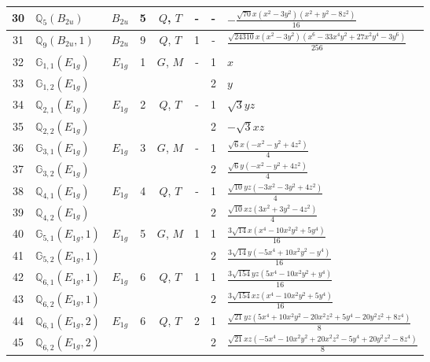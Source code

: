 \documentclass[fleqn,10pt,landscape]{jsarticle}
\begin{document}
\begin{longtable}[l]{clcccccl}
30 & $\mathbb{Q}_{5}(B_{2u})$ & $B_{2u}$ & 5 & $Q$, $T$ & - & - & $- \frac{\sqrt{70} x \left(x^{2} - 3 y^{2}\right) \left(x^{2} + y^{2} - 8 z^{2}\right)}{16}$ \\ \hline
31 & $\mathbb{Q}_{9}(B_{2u},1)$ & $B_{2u}$ & 9 & $Q$, $T$ & 1 & - & $\frac{\sqrt{24310} x \left(x^{2} - 3 y^{2}\right) \left(x^{6} - 33 x^{4} y^{2} + 27 x^{2} y^{4} - 3 y^{6}\right)}{256}$ \\ \hline
32 & $\mathbb{G}_{1,1}(E_{1g})$ & $E_{1g}$ & 1 & $G$, $M$ & - & 1 & $x$ \\
33 & $\mathbb{G}_{1,2}(E_{1g})$ &  &  &  &  & 2 & $y$ \\ \hline
34 & $\mathbb{Q}_{2,1}(E_{1g})$ & $E_{1g}$ & 2 & $Q$, $T$ & - & 1 & $\sqrt{3} y z$ \\
35 & $\mathbb{Q}_{2,2}(E_{1g})$ &  &  &  &  & 2 & $- \sqrt{3} x z$ \\ \hline
36 & $\mathbb{G}_{3,1}(E_{1g})$ & $E_{1g}$ & 3 & $G$, $M$ & - & 1 & $\frac{\sqrt{6} x \left(- x^{2} - y^{2} + 4 z^{2}\right)}{4}$ \\
37 & $\mathbb{G}_{3,2}(E_{1g})$ &  &  &  &  & 2 & $\frac{\sqrt{6} y \left(- x^{2} - y^{2} + 4 z^{2}\right)}{4}$ \\ \hline
38 & $\mathbb{Q}_{4,1}(E_{1g})$ & $E_{1g}$ & 4 & $Q$, $T$ & - & 1 & $\frac{\sqrt{10} y z \left(- 3 x^{2} - 3 y^{2} + 4 z^{2}\right)}{4}$ \\
39 & $\mathbb{Q}_{4,2}(E_{1g})$ &  &  &  &  & 2 & $\frac{\sqrt{10} x z \left(3 x^{2} + 3 y^{2} - 4 z^{2}\right)}{4}$ \\ \hline
40 & $\mathbb{G}_{5,1}(E_{1g},1)$ & $E_{1g}$ & 5 & $G$, $M$ & 1 & 1 & $\frac{3 \sqrt{14} x \left(x^{4} - 10 x^{2} y^{2} + 5 y^{4}\right)}{16}$ \\
41 & $\mathbb{G}_{5,2}(E_{1g},1)$ &  &  &  &  & 2 & $\frac{3 \sqrt{14} y \left(- 5 x^{4} + 10 x^{2} y^{2} - y^{4}\right)}{16}$ \\ \hline
42 & $\mathbb{Q}_{6,1}(E_{1g},1)$ & $E_{1g}$ & 6 & $Q$, $T$ & 1 & 1 & $\frac{3 \sqrt{154} y z \left(5 x^{4} - 10 x^{2} y^{2} + y^{4}\right)}{16}$ \\
43 & $\mathbb{Q}_{6,2}(E_{1g},1)$ &  &  &  &  & 2 & $\frac{3 \sqrt{154} x z \left(x^{4} - 10 x^{2} y^{2} + 5 y^{4}\right)}{16}$ \\ \hline
44 & $\mathbb{Q}_{6,1}(E_{1g},2)$ & $E_{1g}$ & 6 & $Q$, $T$ & 2 & 1 & $\frac{\sqrt{21} y z \left(5 x^{4} + 10 x^{2} y^{2} - 20 x^{2} z^{2} + 5 y^{4} - 20 y^{2} z^{2} + 8 z^{4}\right)}{8}$ \\
45 & $\mathbb{Q}_{6,2}(E_{1g},2)$ &  &  &  &  & 2 & $\frac{\sqrt{21} x z \left(- 5 x^{4} - 10 x^{2} y^{2} + 20 x^{2} z^{2} - 5 y^{4} + 20 y^{2} z^{2} - 8 z^{4}\right)}{8}$ \\ \hline

\end{longtable}
\end{document}

